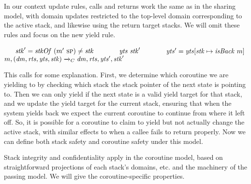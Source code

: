 \documentclass[acmsmall,review,anonymous]{acmart}\settopmatter{printfolios=true,printccs=false,printacmref=false}
\newcommand*{\rsp}{\textsc{sp}}
\begin{document}
{In our context update rules, calls and returns work the same as in the sharing model,
with domain updates restricted to the top-level domain corresponding to the active stack,
and likewise using the return target stacks. We will omit these rules and focus on the new yield rule.

             {~ ~ \(\stackid' = \stackof ~ (\mach'~ \rsp) \not = \stackid\) ~ ~}
             {~ ~ \(\mathit{yts} ~ \mathit{stk}'\) ~ ~}
             {~ ~ \(\mathit{yts}' = \mathit{yts}[\mathit{stk} \mapsto \mathit{isBack} ~ m]\)}
             {\(m,(\mathit{dm},\mathit{rts},\mathit{yts},\mathit{stk}) \xrightarrow{}_C \mathit{dm},\mathit{rts},\mathit{yts}',\mathit{stk}'\)}

This calls for some explanation. First, we determine which coroutine we are yielding to by
checking which stack the stack pointer of the next state is pointing to. Then we can only yield
if the next state is a valid yield target for that stack, and we update the yield target for
the current stack, ensuring that when the system yields back we expect the current coroutine
to continue from where it left off. So, it is possible for a coroutine to claim to yield
but not actually change the active stack, with similar effects to when a callee fails
to return properly. Now we can define both stack safety and coroutine safety under this model.

Stack integrity and confidentiality apply in the coroutine model, based on straightforward
projections of each stack's domains, etc. and the machinery of the passing model. We will give
the coroutine-specific properties.




}
\end{document}
